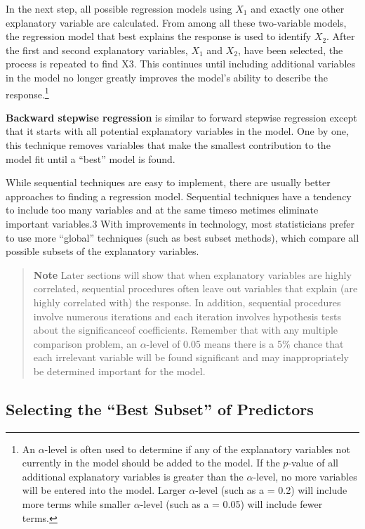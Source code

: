 \documentclass[
]{book}
\begin{document}
In the next step, all possible regression models using \(X_1\) and exactly one other explanatory variable are calculated. From among all these two-variable models, the regression model that best explains the response is used to identify \(X_2\). After the first and second explanatory variables, \(X_1\) and \(X_2\), have been selected, the process is repeated to find X3. This continues until including additional variables in the model no longer
greatly improves the model's ability to describe the response.\footnote{An \(\alpha\)-level is often used to determine if any of the explanatory variables not currently in the model should be added to the model. If the \(p\)-value of all additional explanatory variables is greater than the \(\alpha\)-level, no more variables will be entered into the model. Larger \(\alpha\)-level (such as a = 0.2) will include more terms while smaller \(\alpha\)-level (such as a = 0.05) will include fewer terms.}

\textbf{Backward stepwise regression} is similar to forward stepwise regression except that it starts with all potential explanatory variables in the model. One by one, this technique removes variables that make the smallest contribution to the model fit until a ``best'' model is found.

While sequential techniques are easy to implement, there are usually better approaches to finding a regression model. Sequential techniques have a tendency to include too many variables and at the same timeso metimes eliminate important variables.3 With improvements in technology, most statisticians prefer to use more ``global'' techniques (such as best subset methods), which compare all possible subsets of the explanatory variables.

\begin{quote}
\textbf{Note} Later sections will show that when explanatory variables are highly correlated, sequential procedures often leave out variables that explain (are highly correlated with) the response. In addition, sequential procedures involve numerous iterations and each iteration involves hypothesis tests about the significanceof coefficients. Remember that with any multiple comparison problem, an \(\alpha\)-level of 0.05 means there is a 5\% chance that each irrelevant variable will be found significant and may inappropriately be determined important for the model.
\end{quote}

\hypertarget{selecting-the-best-subset-of-predictors}{%
\subsection*{Selecting the ``Best Subset'' of Predictors}\label{selecting-the-best-subset-of-predictors}}
\end{document}
